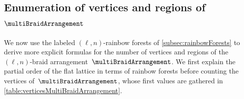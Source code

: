 \documentclass{amsart}
\theoremstyle{definition}
\begin{document}

\subsection{Enumeration of vertices and regions of $\multiBraidArrangement$}
\label{subsec:verticesFacetsMultiBraidArrangement}

We now use the labeled $(\ell,n)$-rainbow forests of \cref{subsec:rainbowForests} to derive more explicit formulas for the number of vertices and regions of the $(\ell,n)$-braid arrangement~$\multiBraidArrangement$. We first explain the partial order of the flat lattice in terms of rainbow forests before counting the vertices of~$\multiBraidArrangement$, whose first values are gathered in \cref{table:verticesMultiBraidArrangement}.

\begin{table}
	\centerline{}
	\vspace{.3cm}
	\caption{The numbers $f_0(\multiBraidArrangement) = \ell \big( (\ell-1) n + 1 \big)^{n-2}$ of vertices of~$\multiBraidArrangement$ for~$\ell,n \in [8]$.}
	\label{table:verticesMultiBraidArrangement}
\end{table}
\end{document}
